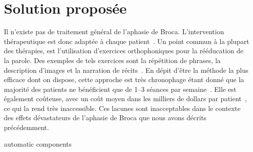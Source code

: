 \section{Solution proposée}

Il n'existe pas de traitement général de l'aphasie de Broca.
L'intervention thérapeutique est donc adaptée à chaque patient~\cite{Acharya_Wroten_2022}.
Un point commun à la plupart des thérapies, 
est l'utilisation d'exercices orthophoniques pour la rééducation de la parole.
Des exemples de tels exercices sont 
la répétition de phrases, la description d'images et la narration de récits~\cite{recover}.
En dépit d'être la méthode la plus efficace dont on dispose,
cette approche est très chronophage étant donné que 
la majorité des patients ne bénéficient que de 1--3 séances par semaine~\cite{recover}.
Elle est également coûteuse, 
avec un coût moyen dans les milliers de dollars par patient~\cite{Liu_Huang_Xu_Wu_Tao_Chen_2021,Jacobs_Ellis_2021},
ce qui la rend très inaccessible.
Ces lacunes sont inacceptables dans le contexte des 
effets dévastateurs de l'aphasie de Broca que nous avons décrits précédemment.

{automatic}
{components}